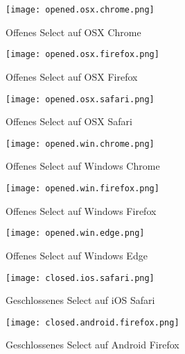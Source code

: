 \begin{figure}[!htb]
    \centering
    \begin{minipage}[b]{0.28\textwidth}
        \centering
        \texttt{[image: opened.osx.chrome.png]}
        \caption{Offenes Select auf OSX Chrome}
        \label{img:openedOsxChromeSelect}
    \end{minipage}
    \hfill
    \begin{minipage}[b]{0.28\textwidth}
        \centering
        \texttt{[image: opened.osx.firefox.png]}
        \caption{Offenes Select auf OSX Firefox}
        \label{img:openedOsxFirefoxSelect}
    \end{minipage}
    \hfill
    \begin{minipage}[b]{0.28\textwidth}
        \centering
        \texttt{[image: opened.osx.safari.png]}
        \caption{Offenes Select auf OSX Safari}
        \label{img:openedOsxSafariSelect}
    \end{minipage}
\end{figure}

\begin{figure}[!htb]
    \centering
    \begin{minipage}[b]{0.28\textwidth}
        \centering
        \texttt{[image: opened.win.chrome.png]}
        \caption{Offenes Select auf Windows Chrome}
        \label{img:openedWinChromeSelect}
    \end{minipage}
    \hfill
    \begin{minipage}[b]{0.28\textwidth}
        \centering
        \texttt{[image: opened.win.firefox.png]}
        \caption{Offenes Select auf Windows Firefox}
        \label{img:openedWinFirefoxSelect}
    \end{minipage}
    \hfill
    \begin{minipage}[b]{0.28\textwidth}
        \centering
        \texttt{[image: opened.win.edge.png]}
        \caption{Offenes Select auf Windows Edge}
        \label{img:openedWinEdgeSelect}
    \end{minipage}
\end{figure}


\begin{figure}[!htb]
    \centering
    \begin{minipage}[b]{0.45\textwidth}
        \centering
        \texttt{[image: closed.ios.safari.png]}
        \caption{Geschlossenes Select auf iOS Safari}
        \label{img:closedIosSafariSelect}
    \end{minipage}
    \hfill
    \begin{minipage}[b]{0.45\textwidth}
        \centering
        \texttt{[image: closed.android.firefox.png]}
        \caption{Geschlossenes Select auf Android Firefox}
        \label{img:closedAndroidFirefoxSelect}
    \end{minipage}
\end{figure}

